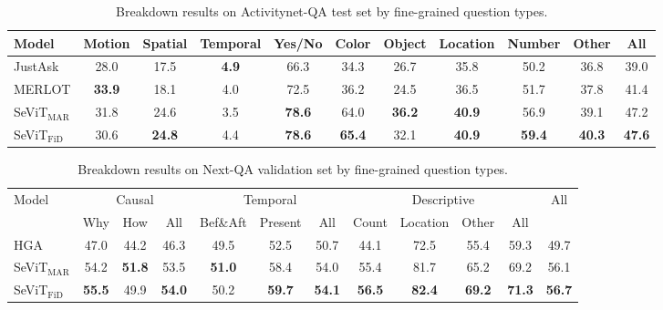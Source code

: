 \documentclass{article}
\newcommand{\frameworkname}{SeViT}
\begin{document}
\begin{table*}[t!]
    \centering
    \small
    \caption{Breakdown results on Activitynet-QA test set by fine-grained question types.}
    \vskip 0.15in
\vskip 0.15in
   \begin{adjustbox}{width=0.85\textwidth} 
    \begin{tabular}{lcccccccccc}
        \toprule
        Model & Motion & Spatial & Temporal & Yes/No & Color & Object & Location & Number & Other & All \\
        \midrule
        JustAsk & 28.0 & 17.5 & \textbf{4.9} & 66.3 & 34.3 & 26.7 & 35.8 & 50.2 & 36.8 & 39.0 \\
        MERLOT & \textbf{33.9} & 18.1 & 4.0 & 72.5 & 36.2 & 24.5 & 36.5 & 51.7 & 37.8 & 41.4 \\
        \midrule
        \frameworkname{}$_\text{MAR}$ & 31.8 & 24.6 & 3.5 & \textbf{78.6} & 64.0 & \textbf{36.2} & \textbf{40.9} & 56.9 & 39.1 & 47.2 \\
        \frameworkname{}$_\text{FiD}$ & 30.6 & \textbf{24.8} & 4.4 & \textbf{78.6} & \textbf{65.4} & 32.1 & \textbf{40.9} & \textbf{59.4} & \textbf{40.3} & \textbf{47.6} \\
        \bottomrule
    \end{tabular}
    \end{adjustbox}
\label{table:activitynet_question}
\end{table*} \begin{table*}[t!]
    \centering
    \small
    \caption{Breakdown results on Next-QA validation set by fine-grained question types.}
    \vskip 0.15in
\vskip 0.15in
   \begin{adjustbox}{width=0.85\textwidth} 
    \begin{tabular}{lccccccccccc}
        \toprule
        \multirow{2}[3]{*}{Model} & \multicolumn{3}{c}{Causal} & \multicolumn{3}{c}{Temporal} & \multicolumn{4}{c}{Descriptive}& \multirow{2}[3]{*}{All} \\
        \cmidrule(r){2-4}
        \cmidrule(r){5-7}
        \cmidrule(r){8-11}
        & Why & How & All & Bef\&Aft & Present & All & Count & Location & Other & All & \\
        \midrule
        HGA & 47.0 & 44.2 & 46.3 & 49.5 & 52.5 & 50.7 & 44.1 & 72.5 & 55.4 & 59.3 & 49.7 \\
        \midrule
        \frameworkname{}$_\text{MAR}$ & 54.2 & \textbf{51.8} & 53.5 & \textbf{51.0} & 58.4 & 54.0 & 55.4 & 81.7 & 65.2 & 69.2 & 56.1 \\
        \frameworkname{}$_\text{FiD}$ & \textbf{55.5} & 49.9 & \textbf{54.0} & 50.2 & \textbf{59.7} & \textbf{54.1} & \textbf{56.5} & \textbf{82.4} & \textbf{69.2} & \textbf{71.3} & \textbf{56.7} \\

\end{tabular}
\end{adjustbox}
\end{table*}
\end{document}
